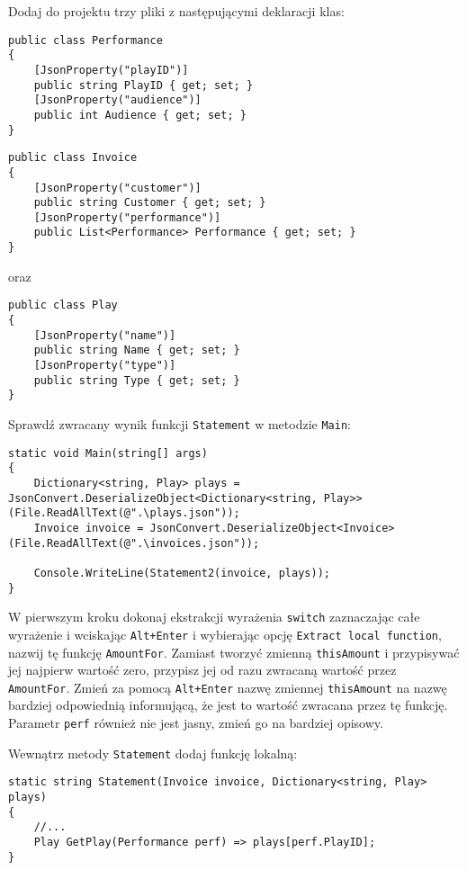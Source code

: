 Dodaj do projektu trzy pliki z następującymi deklaracji klas:
\begin{lstlisting}[caption={Performance.cs}]
public class Performance
{
	[JsonProperty("playID")]
	public string PlayID { get; set; }
	[JsonProperty("audience")]
	public int Audience { get; set; }
}
\end{lstlisting}
\begin{lstlisting}[caption={Invoice.cs}]
public class Invoice
{
	[JsonProperty("customer")]
	public string Customer { get; set; }
	[JsonProperty("performance")]
	public List<Performance> Performance { get; set; }
}
\end{lstlisting}
oraz
\begin{lstlisting}[caption={Play.cs}]
public class Play
{
	[JsonProperty("name")]
	public string Name { get; set; }
	[JsonProperty("type")]
	public string Type { get; set; }
}
\end{lstlisting}

Sprawdź zwracany wynik funkcji \texttt{Statement} w metodzie \texttt{Main}:
\begin{lstlisting}[caption={Play.cs}]
static void Main(string[] args)
{
	Dictionary<string, Play> plays = JsonConvert.DeserializeObject<Dictionary<string, Play>>(File.ReadAllText(@".\plays.json"));
	Invoice invoice = JsonConvert.DeserializeObject<Invoice>(File.ReadAllText(@".\invoices.json"));
	
	Console.WriteLine(Statement2(invoice, plays));
}
\end{lstlisting}

W pierwszym kroku dokonaj ekstrakcji wyrażenia \texttt{switch} zaznaczając całe wyrażenie i wciskając \texttt{Alt+Enter} i wybierając opcję \texttt{Extract local function}, nazwij tę funkcję \texttt{AmountFor}. Zamiast tworzyć zmienną \texttt{thisAmount} i przypisywać jej najpierw wartość zero, przypisz jej od razu zwracaną wartość przez \texttt{AmountFor}. Zmień za pomocą \texttt{Alt+Enter} nazwę zmiennej \texttt{thisAmount} na nazwę bardziej odpowiednią informującą, że jest to wartość zwracana przez tę funkcję. Parametr \texttt{perf} również nie jest jasny, zmień go na bardziej opisowy.

Wewnątrz metody \texttt{Statement} dodaj funkcję lokalną:
\begin{lstlisting}[caption={Dodanie wyrażenia \texttt{GetPlay}}]
static string Statement(Invoice invoice, Dictionary<string, Play> plays)
{
	//...
	Play GetPlay(Performance perf) => plays[perf.PlayID];	
}
\end{lstlisting}

